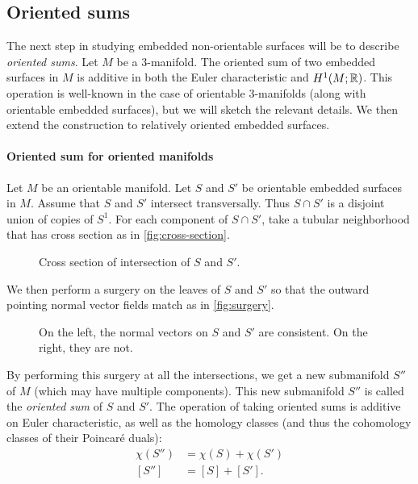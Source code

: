 \subsection{Oriented sums}
\label{sec:oriented-sums}

The next step in studying embedded non-orientable surfaces will be to describe \emph{oriented sums}.  Let $M$ be a 3-manifold.
The oriented sum of two embedded surfaces in $M$ is additive in both the Euler characteristic and $H^1(M;\mathbb{R})$.
This operation is well-known in the case of orientable $3$-manifolds (along with orientable embedded surfaces), but we will sketch the relevant details.
We then extend the construction to relatively oriented embedded surfaces.

\paragraph{Oriented sum for oriented manifolds}
Let $M$ be an orientable manifold.
Let $S$ and $S'$ be orientable embedded surfaces in $M$.
Assume that $S$ and $S'$ intersect transversally.
Thus $S \cap S'$ is a disjoint union of copies of $S^1$.
For each component of $S\cap S'$, take a tubular neighborhood that has cross section as in \autoref{fig:cross-section}.
\begin{figure}
  \centering
  \caption{Cross section of intersection of $S$ and $S'$.}
  \label{fig:cross-section}
\end{figure}



We then perform a surgery on the leaves of $S$ and $S'$ so that the outward pointing normal vector fields match as in \autoref{fig:surgery}.
\begin{figure}[b]
  \centering
  \caption{On the left, the normal vectors on $S$ and $S'$ are consistent. On the right, they are not.}
  \label{fig:surgery}
\end{figure}

By performing this surgery at all the intersections, we get a new submanifold $S''$ of $M$ (which may have multiple components).
This new submanifold $S''$ is called the {\it oriented sum} of $S$ and $S'$.
The operation of taking oriented sums is additive on Euler characteristic, as well as the homology classes (and thus the cohomology classes of their Poincar\'e duals):
\begin{align*}
  \chi(S'') &= \chi(S) + \chi(S') \\
  [S''] &= [S] + [S'].
\end{align*}

